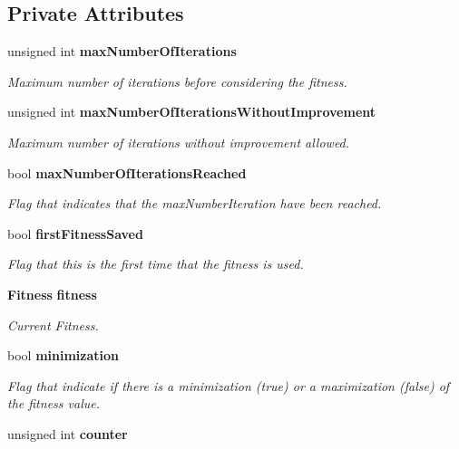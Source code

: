 \subsection*{Private Attributes}
\begin{CompactItemize}
\item 
unsigned int {\bf maxNumberOfIterations}\label{classmo_steady_fit_sol_continue_36b43c2a252887ad027165ac32393fe8}

\begin{CompactList}\small\item\em Maximum number of iterations before considering the fitness. \item\end{CompactList}\item 
unsigned int {\bf maxNumberOfIterationsWithoutImprovement}\label{classmo_steady_fit_sol_continue_cde593c09f497a5fa66ff62732544f40}

\begin{CompactList}\small\item\em Maximum number of iterations without improvement allowed. \item\end{CompactList}\item 
bool {\bf maxNumberOfIterationsReached}\label{classmo_steady_fit_sol_continue_7d88c0eb91b2a12121ba1c3ae9139887}

\begin{CompactList}\small\item\em Flag that indicates that the maxNumberIteration have been reached. \item\end{CompactList}\item 
bool {\bf firstFitnessSaved}\label{classmo_steady_fit_sol_continue_025bf2789e470fdde989eee9121035c3}

\begin{CompactList}\small\item\em Flag that this is the first time that the fitness is used. \item\end{CompactList}\item 
{\bf Fitness} {\bf fitness}\label{classmo_steady_fit_sol_continue_a5c62e7049b36f6e71e92b559568c09e}

\begin{CompactList}\small\item\em Current Fitness. \item\end{CompactList}\item 
bool {\bf minimization}
\begin{CompactList}\small\item\em Flag that indicate if there is a minimization (true) or a maximization (false) of the fitness value. \item\end{CompactList}\item 
unsigned int {\bf counter}\label{classmo_steady_fit_sol_continue_245c9099a2c40dfc4f34b3ff216d13ce}


\end{CompactItemize}
